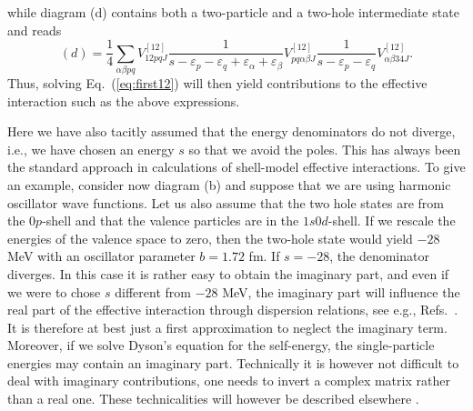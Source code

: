 \documentclass[twoside,12pt]{article}
\begin{document}
while diagram (d) contains both a two-particle and a two-hole
intermediate state and reads
\begin{equation}
      (d)=\frac{1}{4}\sum_{\alpha\beta pq}V^{[12]}_{12pq J}
      \frac{1}{s-\varepsilon_p-
                \varepsilon_q+\varepsilon_{\alpha}+
                \varepsilon_{\beta}}
      V^{[12]}_{pq\alpha\beta J}
      \frac{1}{s-\varepsilon_p-
                \varepsilon_q}
       V^{[12]}_{\alpha\beta 34 J}.
      \label{eq:thirdg2h}
\end{equation}
Thus, solving Eq.\ (\ref{eq:first12}) will then
yield contributions to the effective interaction
such as the above expressions.

Here we have also tacitly assumed that the energy denominators
do not diverge, i.e., we have chosen an energy $s$
so that we avoid the poles. This has always been the standard
approach in calculations of shell-model
effective interactions. To give an example, consider
now diagram (b) and suppose that we are using harmonic
oscillator wave functions. Let us also assume that the two
hole states are from the $0p$-shell and that the valence
particles are in the $1s0d$-shell. If we rescale the
energies of the valence space to zero, then the two-hole
state would yield $-28$ MeV with an oscillator parameter
$b=1.72$ fm. If $s=-28$, the denominator diverges.
In this case it is rather easy to obtain the imaginary
part, and even if we were to chose $s$ different
from $-28$ MeV, the imaginary part will influence the real
part of the effective interaction through dispersion
relations, see e.g., Refs.\ \cite{angels88,rpd89,ms92}.
It is therefore at best just a first approximation
to neglect the imaginary term.
Moreover, if we solve Dyson's equation for the
self-energy, the single-particle energies may contain
an imaginary part.
Technically it is however not difficult to deal
with imaginary contributions, one needs to
invert a complex  matrix rather than a real one.
These technicalities
will however be described elsewhere \cite{mhj99}.
\end{document}
